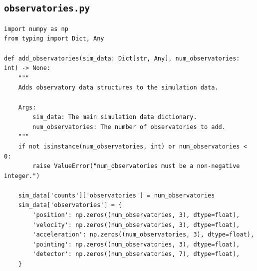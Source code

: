 \documentclass[11pt]{article}
\begin{document}
\subsection{\texttt{observatories.py}}
\begin{Verbatim}
import numpy as np
from typing import Dict, Any

def add_observatories(sim_data: Dict[str, Any], num_observatories: int) -> None:
    """
    Adds observatory data structures to the simulation data.

    Args:
        sim_data: The main simulation data dictionary.
        num_observatories: The number of observatories to add.
    """
    if not isinstance(num_observatories, int) or num_observatories < 0:
        raise ValueError("num_observatories must be a non-negative integer.")

    sim_data['counts']['observatories'] = num_observatories
    sim_data['observatories'] = {
        'position': np.zeros((num_observatories, 3), dtype=float),
        'velocity': np.zeros((num_observatories, 3), dtype=float),
        'acceleration': np.zeros((num_observatories, 3), dtype=float),
        'pointing': np.zeros((num_observatories, 3), dtype=float),
        'detector': np.zeros((num_observatories, 7), dtype=float),
    }
\end{Verbatim}
\end{document}
